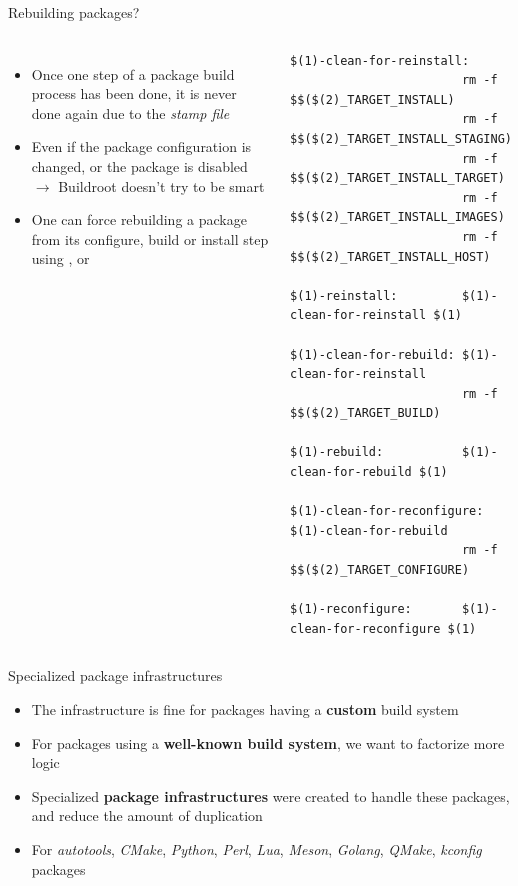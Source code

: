 \begin{frame}[fragile]{Rebuilding packages?}
  \begin{columns}
  \begin{itemize}
  \item Once one step of a package build process has been done, it is
    never done again due to the {\em stamp file}
  \item Even if the package configuration is changed, or the package
    is disabled $\rightarrow$ Buildroot doesn't try to be smart
  \item One can force rebuilding a package from its configure, build
    or install step using ,
     or 
  \end{itemize}
  \begin{block}{}
\begin{verbatim}
$(1)-clean-for-reinstall:
                        rm -f $$($(2)_TARGET_INSTALL)
                        rm -f $$($(2)_TARGET_INSTALL_STAGING)
                        rm -f $$($(2)_TARGET_INSTALL_TARGET)
                        rm -f $$($(2)_TARGET_INSTALL_IMAGES)
                        rm -f $$($(2)_TARGET_INSTALL_HOST)

$(1)-reinstall:         $(1)-clean-for-reinstall $(1)

$(1)-clean-for-rebuild: $(1)-clean-for-reinstall
                        rm -f $$($(2)_TARGET_BUILD)

$(1)-rebuild:           $(1)-clean-for-rebuild $(1)

$(1)-clean-for-reconfigure: $(1)-clean-for-rebuild
                        rm -f $$($(2)_TARGET_CONFIGURE)

$(1)-reconfigure:       $(1)-clean-for-reconfigure $(1)
\end{verbatim}
  \end{block}
  \end{columns}
\end{frame}

\begin{frame}{Specialized package infrastructures}
  \begin{itemize}
  \item The  infrastructure is fine for packages
    having a {\bf custom} build system
  \item For packages using a {\bf well-known build system}, we want
    to factorize more logic
  \item Specialized {\bf package infrastructures} were created to
    handle these packages, and reduce the amount of duplication
  \item For {\em autotools}, {\em CMake}, {\em Python}, {\em Perl},
    {\em Lua}, {\em Meson}, {\em Golang}, {\em QMake}, {\em kconfig}
    packages
  \end{itemize}
\end{frame}

